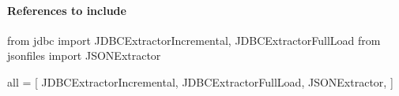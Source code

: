 \documentclass[a4paper,10pt, twoside,english]{sphinxmanual}
\begin{document}
\paragraph{References to include}
\label{\detokenize{base_classes/extractor:references-to-include}}
\def\sphinxLiteralBlockLabel{\label{\detokenize{base_classes/extractor:id2}}}
\begin{sphinxVerbatim}[commandchars=\\\{\}]
 from jdbc import JDBCExtractorIncremental, JDBCExtractorFullLoad
 from json\PYGZus{}files import JSONExtractor
 
 \PYGZus{}\PYGZus{}all\PYGZus{}\PYGZus{} = [
     \PYGZdq{}JDBCExtractorIncremental\PYGZdq{},
     \PYGZdq{}JDBCExtractorFullLoad\PYGZdq{},
     \PYGZdq{}JSONExtractor\PYGZdq{},
 ]
\end{sphinxVerbatim}
\end{document}
